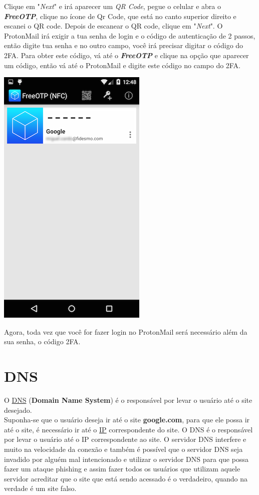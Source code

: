 \documentclass[12pt, letterpaper, Monospace:12]{report}
\begin{document}
	Clique em "\textit{Next}" e irá aparecer um \textit{QR Code}, pegue o celular e abra o \textit{\textbf{FreeOTP}}, clique no ícone de Qr Code, que está no canto superior direito e escanei o QR code. Depois de escanear o QR code, clique em "\textit{Next}". O ProtonMail irá exigir a tua senha de login e o código de autenticação de 2 passos, então digite tua senha e no outro campo, você irá precisar digitar o código do 2FA. Para obter este código, vá até o \textit{\textbf{FreeOTP}} e clique na opção que aparecer um código, então vá até o ProtonMail e digite este código no campo do 2FA.

	\begin{center}
		\includegraphics[scale=0.55]{FreeOTP.png}
	\end{center}

	Agora, toda vez que você for fazer login no ProtonMail será necessário além da sua senha, o código 2FA.

\pagebreak

\section{DNS}
	O \href{https://criptowiki.miraheze.org/wiki/DNS_(Domain_Name_System)}{DNS} (\textbf{Domain Name System}) é o responsável por levar o usuário até o site desejado.\\
	Suponha-se que o usuário deseja ir até o site \textbf{google.com}, para que ele possa ir até o site, é necessário ir até o \href{https://pt.wikipedia.org/wiki/IP}{IP} correspondente do site. O DNS é o responsável por levar o usuário até o IP correspondente ao site.
	O servidor DNS interfere e muito na velocidade da conexão e também é possível que o servidor DNS seja invadido por alguém mal intencionado e utilizar o servidor DNS para que possa fazer um ataque phishing e assim fazer todos os usuários que utilizam aquele servidor acreditar que o site que está sendo acessado é o verdadeiro, quando na verdade é um site falso.\\
\end{document}
